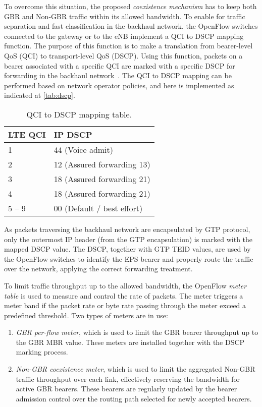 To overcome this situation, the proposed \emph{coexistence mechanism} has to
keep both \ac{GBR} and Non-\ac{GBR} traffic within its allowed bandwidth. To
enable for traffic separation and fast classification in the backhaul network,
the OpenFlow switches connected to the gateway or to the \ac{eNB} implement a
\ac{QCI} to \ac{DSCP} mapping function. The purpose of this function is to make
a translation from bearer-level \ac{QoS} (\ac{QCI}) to transport-level \ac{QoS}
(\ac{DSCP}). Using this function, packets on a bearer associated with a
specific \ac{QCI} are marked with a specific \ac{DSCP} for forwarding in the
backhaul network~\cite{Astudillo2014b, Ekstrom2009}. The \ac{QCI} to \ac{DSCP}
mapping can be performed based on network operator policies, and here is
implemented as indicated at \autoref{tab:dscp}.

\begin{table}[b!]
  \renewcommand{\arraystretch}{1.3}
  \caption{\acs{QCI} to \acs{DSCP} mapping table.}
  \label{tab:dscp}
  \centering
  \begin{tabular}{ll}
    \toprule
    \bfseries \acs{LTE} \acs{QCI} & \bfseries \acs{IP} \acs{DSCP} \\
    \midrule
    1       & 44 (Voice admit)            \\
    2       & 12 (Assured forwarding 13)  \\
    3       & 18 (Assured forwarding 21)  \\
    4       & 18 (Assured forwarding 21)  \\
    5 -- 9  & 00 (Default / best effort)  \\
    \bottomrule
  \end{tabular}
\end{table}

As packets traversing the backhaul network are encapsulated by \ac{GTP}
protocol, only the outermost \ac{IP} header (from the \ac{GTP} encapsulation)
is marked with the mapped \ac{DSCP} value. The \ac{DSCP}, together with
\ac{GTP} \ac{TEID} values, are used by the OpenFlow switches to identify the
\ac{EPS} bearer and properly route the traffic over the network, applying the
correct forwarding treatment.

To limit traffic throughput up to the allowed bandwidth, the OpenFlow
\emph{meter table} is used to measure and control the rate of packets. The
meter triggers a meter band if the packet rate or byte rate passing through the
meter exceed a predefined threshold. Two types of meters are in use:
\begin{enumerate}
  \item \emph{\ac{GBR} per-flow meter}, which is used to limit the \ac{GBR}
  bearer throughput up to the \ac{GBR} \ac{MBR} value. These meters are
  installed together with the \ac{DSCP} marking process.

  \item \emph{Non-\ac{GBR} coexistence meter}, which is used to limit the
  aggregated Non-\ac{GBR} traffic throughput over each link, effectively
  reserving the bandwidth for active \ac{GBR} bearers. These bearers are
  regularly updated by the bearer admission control over the routing path
  selected for newly accepted bearers.
\end{enumerate}

